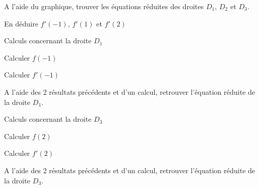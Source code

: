\documentclass[12pt,a4paper]{article}  %
\begin{document}
\begin{enumMet}
	\item A l'aide du graphique, trouver les équations réduites des droites $D_1$, $D_2$ et $D_3$. %
	\item En déduire $f'(-1)$, $f'(1)$ et $f'(2)$ %
	\item Calculs concernant la droite $D_1$
	\begin{enumMet}
	   	\item Calculer $f(-1)$ %
	   	\item Calculer $f'(-1)$ %
	   	\item A l'aide des 2 résultats précédents et d'un calcul, retrouver l'équation réduite de la droite $D_1$. \quad %
	\end{enumMet}
	\item {} Calculs concernant la droite $D_3$
	\begin{enumMet}
		\item {} Calculer $f(2)$ %
		\item {} Calculer $f'(2)$ %
		\item {} A l'aide des 2 résultats précédents et d'un calcul, retrouver l'équation réduite de la droite $D_3$. %
	\end{enumMet}

\end{enumMet}
\end{document}
